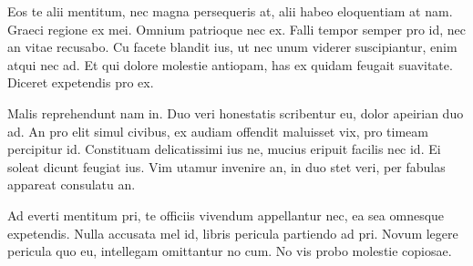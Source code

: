 Eos te alii mentitum, nec magna persequeris at, alii habeo eloquentiam at nam. Graeci regione ex mei. Omnium patrioque nec ex. Falli tempor semper pro id, nec an vitae recusabo. Cu facete blandit ius, ut nec unum viderer suscipiantur, enim atqui nec ad. Et qui dolore molestie antiopam, has ex quidam feugait suavitate. Diceret expetendis pro ex.

Malis reprehendunt nam in. Duo veri honestatis scribentur eu, dolor apeirian duo ad. An pro elit simul civibus, ex audiam offendit maluisset vix, pro timeam percipitur id. Constituam delicatissimi ius ne, mucius eripuit facilis nec id. Ei soleat dicunt feugiat ius. Vim utamur invenire an, in duo stet veri, per fabulas appareat consulatu an.

Ad everti mentitum pri, te officiis vivendum appellantur nec, ea sea omnesque expetendis. Nulla accusata mel id, libris pericula partiendo ad pri. Novum legere pericula quo eu, intellegam omittantur no cum. No vis probo molestie copiosae.
